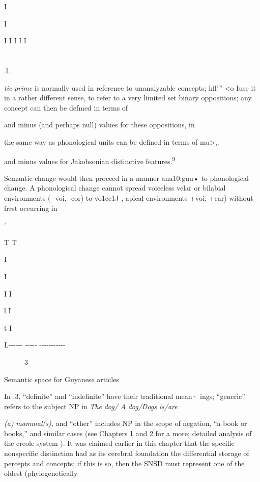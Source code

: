 I 

I

I I I I I

\section{}
.l..

\textit{tic} \textit{prime} is normally used in reference to unanalyzable concepts; hfl'{\textquotedbl}'' {\textless}o Iuse it in a rather different sense, to refer to a very limited set binary oppositions; any concept can then be defmed in terms of

and minus (and perhaps null) values for these oppositions, in

the same way as phonological units can be defined in terms of mu{\textgreater},.

and minus values for Jakobsonian distinctive features.\textsuperscript{9}

Semantic change would then proceed in a manner ana10:guu• to phonological change. A phonological change cannot spread voiceless velar or bilabial environments ( {}-voi, {}-cor) to vo1ce1J , apical environments +voi, +car) without frrst occurring in

'

T T

I

I

I I

l I

t I

L-{}-{}-{}-{}-{}- {}-{}-{}-{}-{}- {}-{}-{}-{}-{}-{}-{}-{}-{}-{}-{}-

\begin{figure}
\caption{3}
\label{fig:4}
\end{figure}

Semantic space for Guyanese articles



In .3, ``definite'' and ``indefinite'' have their traditional mean· ings; ``generic'' refers to the subject NP in \textit{The} \textit{dog}\textit{/} \textit{A} \textit{dog/Dogs} \textit{is/are}

\textit{(a)} \textit{mammal(s), }and ``other'' includes NP in the scope of negation, ``a book or books,'' and similar cases (see Chapters 1 and 2 for a more; detailed analysis of the creole system ). It was claimed earlier in this chapter that the specific-nonspecific distinction had as its cerebral foundation the differential storage of percepts and concepts; if this is so, then the SNSD must represent one of the oldest (phylogenetically

